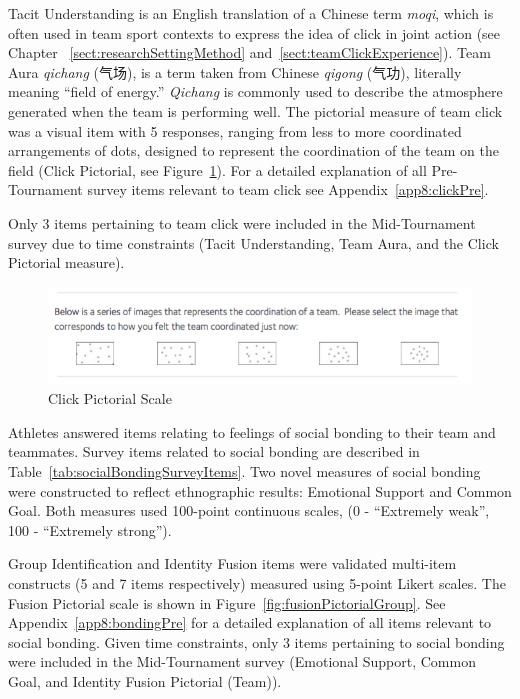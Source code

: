 \begin{CJK}{UTF8}{gbsn}
Tacit Understanding is an English translation of a Chinese term \textit{moqi}, which is often used in team sport contexts to express the idea of click in joint action (see Chapter ~\ref{sect:researchSettingMethod} and~\ref{sect:teamClickExperience}).  Team Aura \textit{qichang} (气场), is a term taken from Chinese \textit{qigong} (气功), literally meaning ``field of energy.'' \textit{Qichang} is commonly used to describe the atmosphere generated when the team is performing well.  The pictorial measure of team click was a visual item with 5 responses, ranging from less to more coordinated arrangements of dots, designed to represent the coordination of the team on the field (Click Pictorial, see Figure~\ref{fig:clickPictorial}).
For a detailed explanation of all Pre-Tournament survey items relevant to team click see Appendix~\ref{app8:clickPre}.

Only 3 items pertaining to team click were included in the Mid-Tournament survey due to time constraints (Tacit Understanding, Team Aura, and the Click Pictorial measure).




  \begin{figure}[htbp]
    \includegraphics[width = \linewidth]{images/teamClickPictorial.png}
    \caption{Click Pictorial Scale}
    \label{fig:clickPictorial}
  \end{figure}


Athletes answered items relating to feelings of social bonding to their team and teammates.  Survey items related to social bonding are described in Table~\ref{tab:socialBondingSurveyItems}. Two novel measures of social bonding were constructed to reflect ethnographic results: Emotional Support and Common Goal.  Both measures used 100-point continuous scales, (0 - ``Extremely weak'', 100 - ``Extremely strong'').

Group Identification and Identity Fusion items were validated multi-item constructs (5 and 7 items respectively) measured using 5-point Likert scales. The Fusion Pictorial scale is shown in Figure~\ref{fig:fusionPictorialGroup}.  See Appendix~\ref{app8:bondingPre} for a detailed explanation of all items relevant to social bonding.  Given time constraints, only 3 items pertaining to social bonding were included in the Mid-Tournament survey (Emotional Support, Common Goal, and Identity Fusion Pictorial (Team)).


\end{CJK}
